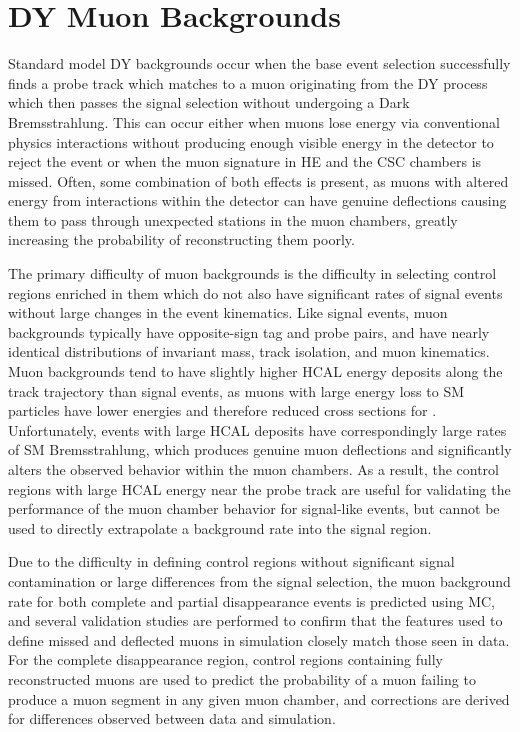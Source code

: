 \section{DY Muon Backgrounds}
Standard model DY backgrounds occur when the base event selection successfully finds a probe track which matches to a muon originating from the DY process which then passes the signal selection without undergoing a Dark Bremsstrahlung. 
This can occur either when muons lose energy via conventional physics interactions without producing enough visible energy in the detector to reject the event or when the muon signature in HE and the CSC chambers is missed.
Often, some combination of both effects is present, as muons with altered energy from interactions within the detector can have genuine deflections causing them to pass through unexpected stations in the muon chambers, greatly increasing the probability of reconstructing them poorly.

The primary difficulty of muon backgrounds is the difficulty in selecting control regions enriched in them which do not also have significant rates of signal events without large changes in the event kinematics.
Like signal events, muon backgrounds typically have opposite-sign tag and probe pairs, and have nearly identical distributions of invariant mass, track isolation, and muon kinematics.
Muon backgrounds tend to have slightly higher HCAL energy deposits along the track trajectory than signal events, as muons with large energy loss to SM particles have lower energies and therefore reduced cross sections for \dbrem.
Unfortunately, events with large HCAL deposits have correspondingly large rates of SM Bremsstrahlung, which produces genuine muon deflections and significantly alters the observed behavior within the muon chambers.
As a result, the control regions with large HCAL energy near the probe track are useful for validating the performance of the muon chamber behavior for signal-like events, but cannot be used to directly extrapolate a background rate into the signal region. 

Due to the difficulty in defining control regions without significant signal contamination or large differences from the signal selection, the muon background rate for both complete and partial disappearance events is predicted using MC, and several validation studies are performed to confirm that the features used to define missed and deflected muons in simulation closely match those seen in data.
For the complete disappearance region, control regions containing fully reconstructed muons are used to predict the probability of a muon failing to produce a muon segment in any given muon chamber, and corrections are derived for differences observed between data and simulation.

